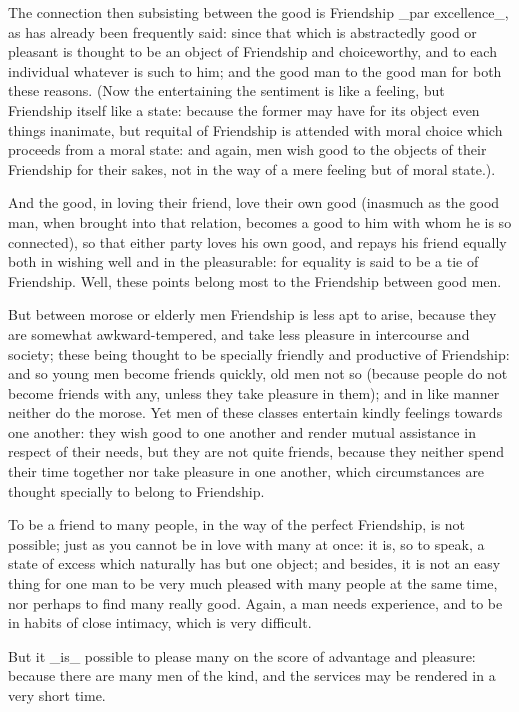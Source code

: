 The connection then subsisting between the good is Friendship _par
excellence_, as has already been frequently said: since that which is
abstractedly good or pleasant is thought to be an object of Friendship
and choiceworthy, and to each individual whatever is such to him;
and the good man to the good man for both these reasons. (Now the
entertaining the sentiment is like a feeling, but Friendship itself
like a state: because the former may have for its object even things
inanimate, but requital of Friendship is attended with moral choice
which proceeds from a moral state: and again, men wish good to the
objects of their Friendship for their sakes, not in the way of a mere
feeling but of moral state.).

And the good, in loving their friend, love their own good (inasmuch as
the good man, when brought into that relation, becomes a good to him
with whom he is so connected), so that either party loves his own
good, and repays his friend equally both in wishing well and in the
pleasurable: for equality is said to be a tie of Friendship. Well, these
points belong most to the Friendship between good men.

But between morose or elderly men Friendship is less apt to arise,
because they are somewhat awkward-tempered, and take less pleasure in
intercourse and society; these being thought to be specially friendly
and productive of Friendship: and so young men become friends quickly,
old men not so (because people do not become friends with any, unless
they take pleasure in them); and in like manner neither do the morose.
Yet men of these classes entertain kindly feelings towards one another:
they wish good to one another and render mutual assistance in respect of
their needs, but they are not quite friends, because they neither
spend their time together nor take pleasure in one another, which
circumstances are thought specially to belong to Friendship.

To be a friend to many people, in the way of the perfect Friendship, is
not possible; just as you cannot be in love with many at once: it is,
so to speak, a state of excess which naturally has but one object; and
besides, it is not an easy thing for one man to be very much pleased
with many people at the same time, nor perhaps to find many really good.
Again, a man needs experience, and to be in habits of close intimacy,
which is very difficult.

But it _is_ possible to please many on the score of advantage and
pleasure: because there are many men of the kind, and the services may
be rendered in a very short time.

